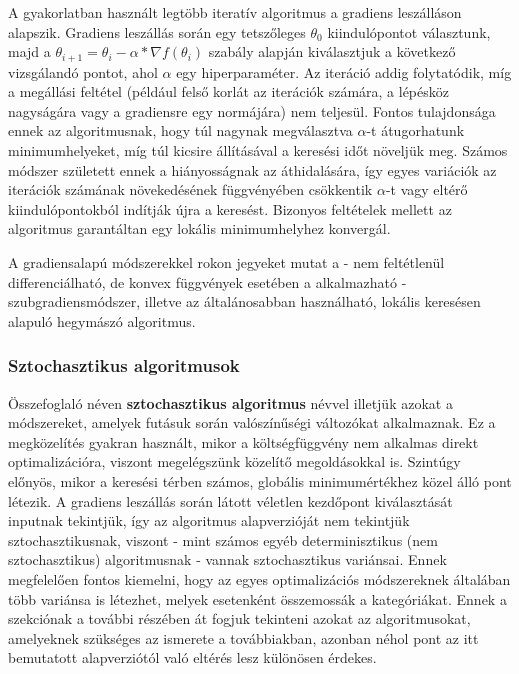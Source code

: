 A gyakorlatban használt legtöbb iteratív algoritmus a gradiens leszálláson alapszik. Gradiens leszállás során egy tetszőleges $\theta_0$ kiindulópontot választunk, majd a $\theta_{i+1} = \theta_i - \alpha * \nabla f(\theta_i)$ szabály alapján kiválasztjuk a következő vizsgálandó pontot, ahol $\alpha$ egy hiperparaméter. Az iteráció addig folytatódik, míg a megállási feltétel (például felső korlát az iterációk számára, a lépésköz nagyságára vagy a gradiensre egy normájára) nem teljesül. Fontos tulajdonsága ennek az algoritmusnak, hogy túl nagynak megválasztva $\alpha$-t átugorhatunk minimumhelyeket, míg túl kicsire állításával a keresési időt növeljük meg. Számos módszer született ennek a hiányosságnak az áthidalására, így egyes variációk az iterációk számának növekedésének függvényében csökkentik $\alpha$-t vagy eltérő kiindulópontokból indítják újra a keresést. Bizonyos feltételek mellett az algoritmus garantáltan egy lokális minimumhelyhez konvergál\cite{gradient_convergence}.


A gradiensalapú módszerekkel rokon jegyeket mutat a - nem feltétlenül differenciálható, de konvex függvények esetében a alkalmazható - szubgradiensmódszer, illetve az általánosabban használható, lokális keresésen alapuló hegymászó algoritmus.

\subsubsection{Sztochasztikus algoritmusok}

Összefoglaló néven \textbf{sztochasztikus algoritmus} névvel illetjük azokat a módszereket, amelyek futásuk során valószínűségi változókat alkalmaznak. Ez a megközelítés gyakran használt, mikor a költségfüggvény nem alkalmas direkt optimalizációra, viszont megelégszünk közelítő megoldásokkal is. Szintúgy előnyös, mikor a keresési térben számos, globális minimumértékhez közel álló pont létezik. A gradiens leszállás során látott véletlen kezdőpont kiválasztását inputnak tekintjük, így az algoritmus alapverzióját nem tekintjük sztochasztikusnak, viszont - mint számos egyéb determinisztikus (nem sztochasztikus) algoritmusnak - vannak sztochasztikus variánsai. Ennek megfelelően fontos kiemelni, hogy az egyes optimalizációs módszereknek általában több variánsa is létezhet, melyek esetenként összemossák a kategóriákat. Ennek a szekciónak a további részében át fogjuk tekinteni azokat az algoritmusokat, amelyeknek szükséges az ismerete a továbbiakban, azonban néhol pont az itt bemutatott alapverziótól való eltérés lesz különösen érdekes.


